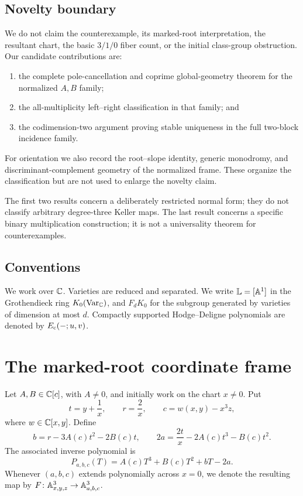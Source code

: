 \documentclass[11pt,reqno]{amsart}
\begin{document}
\subsection*{Novelty boundary}

We do not claim the counterexample, its marked-root interpretation, the
resultant chart, the basic \(3/1/0\) fiber count, or the initial class-group
obstruction.  Our candidate contributions are:

\begin{enumerate}[label=(\roman*)]
\item the complete pole-cancellation and coprime global-geometry theorem for
the normalized \(A,B\) family;
\item the all-multiplicity left--right classification in that family; and
\item the codimension-two argument proving stable uniqueness in the full
two-block incidence family.
\end{enumerate}

For orientation we also record the root--slope identity, generic monodromy,
and discriminant-complement geometry of the normalized frame.  These organize
the classification but are not used to enlarge the novelty claim.

The first two results concern a deliberately restricted normal form; they do
not classify arbitrary degree-three Keller maps.  The last result concerns a
specific binary multiplication construction; it is not a universality
theorem for counterexamples.

\subsection*{Conventions}

We work over \(\mathbb C\).  Varieties are reduced and separated.  We write
\(\mathbb L=[\mathbb A^1]\) in the Grothendieck ring
\(K_0(\operatorname{Var}_{\mathbb C})\), and \(F_dK_0\) for the subgroup generated
by varieties of dimension at most \(d\).  Compactly supported
Hodge--Deligne polynomials are denoted by \(E_{\mathrm c}(-;u,v)\).

\section{The marked-root coordinate frame}
\label{sec:frame}

Let \(A,B\in\mathbb C[c]\), with \(A\ne0\), and initially work on the chart
\(x\ne0\).  Put
\begin{equation}
\label{eq:frame}
t=y+\frac1x,\qquad r=\frac2x,\qquad c=w(x,y)-x^3z,
\end{equation}
where \(w\in\mathbb C[x,y]\).  Define
\begin{equation}
\label{eq:ab-map}
b=r-3A(c)t^2-2B(c)t,\qquad
2a=\frac{2t}{x}-2A(c)t^3-B(c)t^2.
\end{equation}
The associated inverse polynomial is
\begin{equation}
\label{eq:inverse-cubic}
P_{a,b,c}(T)=A(c)T^3+B(c)T^2+bT-2a.
\end{equation}
Whenever \((a,b,c)\) extends polynomially across \(x=0\), we denote the
resulting map by \(F\colon\mathbb A^3_{x,y,z}\to\mathbb A^3_{a,b,c}\).
\end{document}
